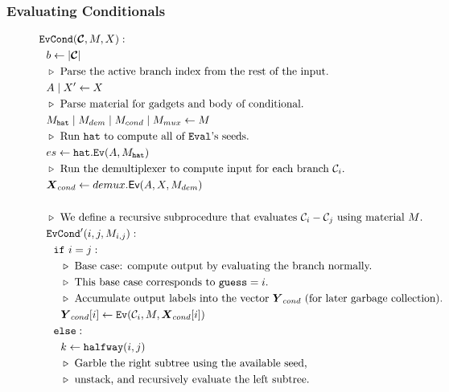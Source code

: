 \subsubsection{Evaluating Conditionals}

\begin{figure}
  \begin{align*}
    &\evcond(\vec{\cir}, \mat, X):\\
    &~~b \gets | \vec{\cir} |\\
    &~~\codecomment{Parse the active branch index from the rest of the
    input.}\\
    &~~\aid \mid X' \gets X\\
    &~~\codecomment{Parse material for gadgets and body of conditional.}\\
    &~~\mat_\gadget \mid \mat_{dem} \mid \mat_{cond} \mid \mat_{mux} \gets \mat\\
    &~~\codecomment{Run $\gadget$ to compute all of \E's seeds.}\\
    &~~es \gets \gadget.\mathtt{Ev}(\aid, \mat_\gadget)\\
    &~~\codecomment{Run the demultiplexer to compute input for each
    branch $\cir_i$.}\\
    &~~\vec{X}_{cond} \gets \evdem(\aid, X, \mat_{dem})\\
    \\
    &~~\codecomment{We define a recursive subprocedure that evaluates $\cir_i - \cir_j$ using material $\mat$.}\\
    &~~\evcond'(i, j, \mat_{i, j}):\\
    &~~~~\cif~i = j:\\
    &~~~~~~\codecomment{Base case: compute output by evaluating the branch normally.}\\
    &~~~~~~\codecomment{This base case corresponds to $\guess = i$.}\\
    &~~~~~~\codecomment{Accumulate output labels into the vector
    $\gcirout_{cond}$ (for later garbage collection).}\\
    &~~~~~~\gcirout_{cond}[i] \gets \ev(\cir_i, M, \gcirinp_{cond}[i])\\
    &~~~~\celse:\\
    &~~~~~~k \gets \halfway(i, j)\\
    &~~~~~~\codecomment{Garble the right subtree using the available
    seed,}\\
    &~~~~~~\codecomment{unstack, and recursively evaluate the left
    subtree.}\\

\end{align*}
\end{figure}
